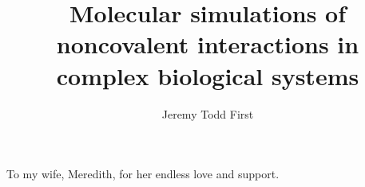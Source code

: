 \documentclass[12pt]{report}	%
\author{Jeremy Todd First}  	%
\title{Molecular simulations of noncovalent interactions in complex biological systems}
\theoremstyle{definition}
\theoremstyle{remark}
\numberwithin{equation}{chapter}
\numberwithin{figure}{chapter}
\begin{document}
\copyrightpage          %


%
%
%
\commcertpage           %

\titlepage              %




\begin{dedication}
%
To my wife, Meredith, for her endless love and support. 
\end{dedication}


\begin{acknowledgments}		%
%

\end{acknowledgments}


%
\utabstract
{}%
\indent



\tableofcontents   %
%
\listoftables      %
\listoffigures     %



%

\end{document}
